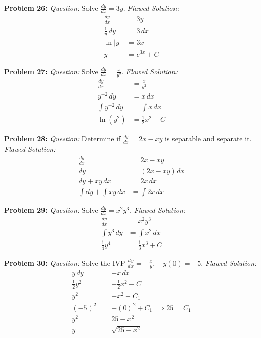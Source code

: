 \documentclass[11pt]{article}
\begin{document}
\textbf{Problem 26:} 
\textit{Question:} Solve $\frac{dy}{dx} = 3y$.
\textit{Flawed Solution:}
\begin{align*}
\frac{dy}{dx} &= 3y \\
\frac{1}{y} \, dy &= 3 \, dx \\
\ln|y| &= 3x \\
y &= e^{3x} + C 
\end{align*}

\textbf{Problem 27:} 
\textit{Question:} Solve $\frac{dy}{dx} = \frac{x}{y^2}$.
\textit{Flawed Solution:}
\begin{align*}
\frac{dy}{dx} &= \frac{x}{y^2} \\
y^{-2} \, dy &= x \, dx \\
\int y^{-2} \, dy &= \int x \, dx \\
\ln(y^2) &= \frac{1}{2}x^2 + C
\end{align*}

\textbf{Problem 28:} 
\textit{Question:} Determine if $\frac{dy}{dx} = 2x - xy$ is separable and separate it.
\textit{Flawed Solution:}
\begin{align*}
\frac{dy}{dx} &= 2x - xy \\
dy &= (2x - xy) dx \\
dy + xy \, dx &= 2x \, dx \\
\int dy + \int xy \, dx &= \int 2x \, dx
\end{align*}

\textbf{Problem 29:} 
\textit{Question:} Solve $\frac{dy}{dx} = x^2 y^3$.
\textit{Flawed Solution:}
\begin{align*}
\frac{dy}{dx} &= x^2 y^3 \\
\int y^3 \, dy &= \int x^2 \, dx \\
\frac{1}{4}y^4 &= \frac{1}{3}x^3 + C 
\end{align*}

\textbf{Problem 30:} 
\textit{Question:} Solve the IVP $\frac{dy}{dx} = -\frac{x}{y}, \quad y(0) = -5$.
\textit{Flawed Solution:}
\begin{align*}
y \, dy &= -x \, dx \\
\frac{1}{2}y^2 &= -\frac{1}{2}x^2 + C \\
y^2 &= -x^2 + C_1 \\
(-5)^2 &= -(0)^2 + C_1 \implies 25 = C_1 \\
y^2 &= 25 - x^2 \\
y &= \sqrt{25 - x^2}
\end{align*}

\newpage
\end{document}
